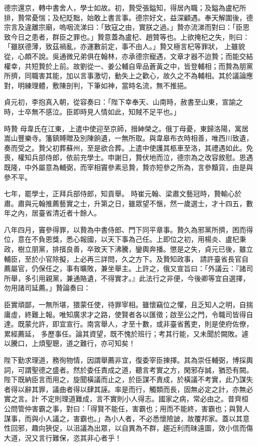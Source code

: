 \begin{pinyinscope}
 德宗還京，轉中書舍人，學士如故。初，贄受張鎰知，得居內職；及鎰為盧杞所排，贄常憂惴；及杞貶黜，始敢上書言事。德宗好文，益深顧遇。奉天解圍後，德宗言及違離宗廟，嗚咽流涕曰：「致寇之由，實朕之過。」贄亦流涕而對曰：「臣思致今日之患者，群臣之罪也。」贄意蓋為盧杞、趙贊等也。上欲掩杞之失，則曰：「雖朕德薄，致茲禍亂，亦運數前定，事不由人。」贄又極言杞等罪狀，
 上雖貌從，心頗不說。吳通微兄弟俱在翰林，亦承德宗寵遇，文章才器不迨贄；而能交結權幸，共短贄於上前。故劉從一、姜公輔自卑品蒼黃之中，皆登輔相；而贄為朋黨所擠，同職害其能，加以言事激切，動失上之歡心，故久之不為輔相。其於議論應對，明練理體，敷陳剖判，下筆如神，當時名流，無不推挹。



 貞元初，李抱真入朝，從容奏曰：「陛下幸奉天、山南時，赦書至山東，宣諭之時，士卒無不感泣。臣即時見人情如此，知賊不足平也。」



 時贄
 母韋氏在江東，上遣中使迎至京師，搢紳榮之。俄丁母憂，東歸洛陽，寓居嵩山豐樂寺。籓鎮賻贈及別陳餉遺，一無所取。與韋皋布衣時相善，唯西川致遺，奏而受之。贄父初葬蘇州，至是欲合葬。上遣中使護其柩車至洛，其禮遇如此。免喪，權知兵部侍郎，依前充學士。申謝日，贄伏地而泣，德宗為之改容敘慰。恩遇既隆，中外屬意為輔弼，而宰相竇參素忌贄，贄亦短參之所為，言參黷貨，由是與參不平。



 七年，罷學士，正拜兵部侍郎，知貢舉。
 時崔元翰、梁肅文藝冠時，贄輸心於肅。肅與元翰推薦藝實之士，升第之日，雖眾望不愜，然一歲選士，才十四五，數年之內，居臺省清近者十餘人。



 八年四月，竇參得罪，以贄為中書侍郎、門下同平章事。贄久為邪黨所擠，困而得位，意在不負恩獎，悉心報國，以天下事為己任。上即位之初，用楊炎、盧杞秉政，樹立朋黨，排擯良善，卒致天下沸騰，鑾輿奔播。懲是之失，貞元已後，雖立輔臣，至於小官除擬，上必再三詳問，久之方下。及贄知政事，
 請許臺省長官自薦屬官，仍保任之，事有曠敗，兼坐舉主。上許之，俄又宣旨曰：「外議云：『諸司所舉，多引用親黨，兼通賂遺，不得實才。』此法行之非便，今後卿等宜自選擇，勿用諸司延薦。」贄論奏曰：



 臣實頑鄙，一無所堪，猥蒙任使，待罪宰相。雖懷竊位之懼，且乏知人之明，自揣庸虛，終難上報。唯知廣求才之路，使賢者各以匯徵；啟至公之門，令職司皆得自達。既蒙允許，即宜宣行。南宮舉人，才至十數，或非臺省舊吏，則是使府佐僚，累經薦延，
 多歷事任。論其資望，既不愧於班行；考其行能，又未聞於闕敗。遽以騰口，上煩聖聰，道之難行，亦可知矣！



 陛下勤求理道，務徇物情，因謂舉薦非宜，復委宰臣揀擇。其為崇任輔弼，博採輿詞，可謂聖德之盛者。然於委任責成之道，聽言考實之方，閑邪存誠，猶恐有闕。陛下既納臣言而用之，旋聞橫議而止之，於臣謀不責成，於橫議不考實，此乃謀失者得以辭其罪，議曲者得以肆其誣。率是而行，觸類而長，固無必定之計，亦無必實之言。計
 不定則理道難成，言不實則小人得志。國家之病，常必由之。昔齊桓公問管仲害霸之事，對曰：「得賢不能任，害霸也；用而不能終，害霸也；與賢人謀事，而與小人議之，害霸也。」為小人者，不必悉懷險詖，故覆邦家。蓋以其意性回邪，趣向狹促，以沮議為出眾，以自異為不群，趨近利而昧遠圖，效小信而傷大道，況又言行難保，恣其非心者乎！




\end{pinyinscope}

